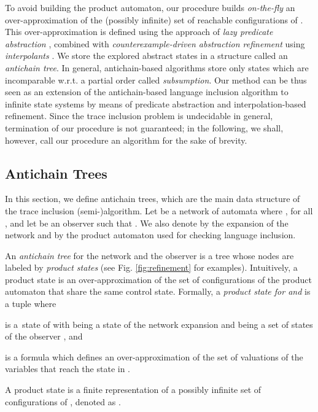 \documentclass{llncs}
\begin{document}
To avoid building the product automaton, our procedure builds
\emph{on-the-fly} an over-approximation of the (possibly infinite) set
of reachable configurations of . This over-approximation is defined using the approach
of \emph{lazy predicate abstraction} \cite{lazy-abstraction}, combined
with \emph{counterexample-driven abstraction refinement} using
\emph{interpolants} \cite{mcmillan06}. We store the explored abstract
states in a structure called an \emph{antichain tree}. In general,
antichain-based algorithms
\cite{henzinger06} store only states
which are incomparable w.r.t. a partial order called
\emph{subsumption}. Our method can be thus seen as an extension of the
antichain-based language inclusion algorithm \cite{abdulla} to infinite
state systems by means of predicate abstraction and
interpolation-based refinement. Since the trace inclusion problem is
undecidable in general, termination of our procedure is not
guaranteed; in the following, we shall, however, call our procedure an
algorithm for the sake of brevity.

\vspace*{-1mm}\subsection{Antichain Trees}


In this section, we define antichain trees, which are the main data
structure of the trace inclusion (semi-)algorithm. Let  be a network of automata where , for
all , and let  be an
observer such that . We
also denote by  the
expansion of the network  and by  the product
automaton used for checking language inclusion.

An \emph{antichain tree} for the network  and the
observer  is a tree whose nodes are labeled by \emph{product
  states} (see Fig. \ref{fig:refinement} for examples). Intuitively, a
product state is an over-approximation of the set of configurations of
the product automaton  that share
the same control state. Formally, a \emph{product state for
   and } is a tuple 
where\begin{inparaenum}[(i)]
\item  is a~state of 
  with  being a state of the network
  expansion  and  being a set of states of the
  observer , and
\item  is a formula which
  defines an over-approximation of the set of valuations of the
  variables  that reach the state
   in .
\end{inparaenum}
A product state  is a finite representation of a
possibly infinite set of configurations of 
, denoted as .
\end{document}
